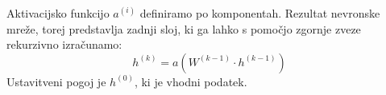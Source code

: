Aktivacijsko funkcijo $a^{(i)}$ definiramo po komponentah. Rezultat nevronske mreže, torej predstavlja zadnji sloj, ki ga lahko s pomočjo zgornje zveze rekurzivno izračunamo:
\begin{equation}
    h^{(k)} = a(W^{(k - 1)} \cdot h^{(k - 1)})
    \label{eq:eq1}
\end{equation}
Ustavitveni pogoj je $h^{(0)}$, ki je vhodni podatek.


